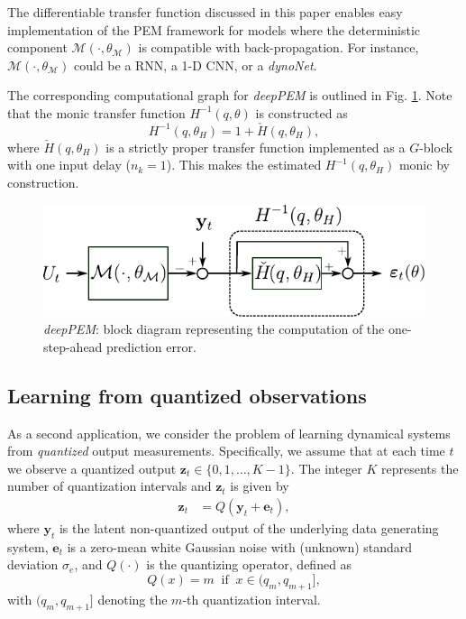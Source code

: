 \documentclass{article}
\newcommand{\tvec}[1]{\mathbf{#1}}
\newcommand{\Name}{\emph{dynoNet}}
\newcommand{\vv}{z}
\begin{document}
The differentiable transfer function discussed in this paper enables easy implementation of the PEM 
framework for models where the deterministic component $\mathcal{M}(\cdot,\theta_\mathcal{M})$ is   compatible with back-propagation. For instance, $\mathcal{M}(\cdot,\theta_\mathcal{M})$ could be a RNN, a 1-D CNN, or a \Name. 

The corresponding computational graph for \emph{deepPEM} is outlined in Fig. \ref{fig:neural_PEM}. Note that the monic transfer function $H^{-1}(q, \theta)$ is constructed as $$H^{-1}(q, \theta_H) = 1 + \check{H}(q, \theta_H),$$
where $\check{H}(q, \theta_H)$ is a strictly proper transfer function implemented as 
a $G$-block with one input delay ($n_k\!=\!1$). 
This makes the estimated $H^{-1}(q, \theta_H)$ monic by construction.


\begin{figure}
	\centering
	\includegraphics[width=.45\textwidth]{fig/neural_PEM.pdf} \vspace{-0.1cm}
	\caption{\emph{deepPEM}: block diagram representing the computation of the one-step-ahead prediction error.}
	\label{fig:neural_PEM}
\end{figure}
 
\subsection{Learning from quantized observations} 
\label{sec:quantized}
As a second application, we consider the problem of learning dynamical systems from \emph{quantized} output measurements. Specifically, we assume that at each time $t$ we observe a quantized output $\tvec{\vv}_t \in \{0,1,\ldots,K\!-\!1\}$. The integer $K$ represents the number of quantization intervals and $\tvec{\vv}_t$ is given by
\begin{subequations}
\begin{align}
\label{datagen_quant}
 \tvec{\vv}_t &= Q(\tvec{y}_t + \tvec{e}_t),
\end{align}
\end{subequations}
where $\tvec{y}_t$ is the latent non-quantized output of the underlying data generating system, $\tvec{e}_t$ is a zero-mean white Gaussian noise with (unknown) standard deviation $\sigma_e$, and 
 $Q(\cdot)$ is the quantizing operator, defined as
\begin{equation}
 Q(x) = m \;\; \text{if}\;\; x \in (q_m, q_{m+1}],
\end{equation}
with  $(q_m, q_{m+1}]$ denoting  the $m$-th quantization interval.
\end{document}
